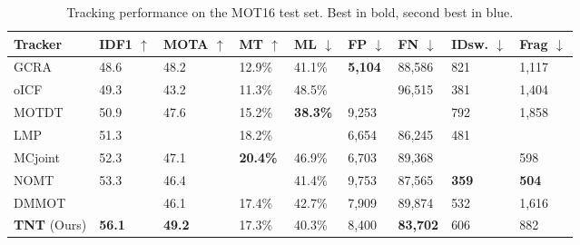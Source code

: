 \documentclass[10pt,twocolumn,letterpaper]{article}
\begin{document}
\begin{table*}
\begin{center}
\begin{tabular}{|L{2.9cm}|C{1.2cm}|C{1.3cm}|C{1.2cm}|C{1.2cm}|C{1.2cm}|C{1.2cm}|C{1.2cm}|C{1.2cm}|}
\hline
Tracker & IDF1 $\uparrow$ & MOTA $\uparrow$ & MT $\uparrow$ & ML $\downarrow$ & FP $\downarrow$ & FN $\downarrow$ & IDsw. $\downarrow$ & Frag $\downarrow$ \\
\hline\hline
GCRA \cite{ma2018trajectory} & 48.6 & 48.2 & 12.9\% & 41.1\% & \textbf{5,104} & 88,586 & 821 & 1,117 \\
oICF \cite{kieritz2016online} & 49.3 & 43.2 & 11.3\% & 48.5\% & \noindent\color{cyan}{6,651} & 96,515 & 381 & 1,404 \\
MOTDT \cite{long2018real} & 50.9 & 47.6 & 15.2\% & \textbf{38.3\%} & 9,253 & \noindent\color{cyan}{85,431} & 792 & 1,858 \\
LMP \cite{tang2017multiple} & 51.3 & \noindent\color{cyan}{48.8} & 18.2\% & \noindent\color{cyan}{40.1\%} & 6,654 & 86,245 & 481 & \noindent\color{cyan}{595} \\
MCjoint \cite{keuper2016multi} & 52.3 & 47.1 & \textbf{20.4\%} & 46.9\% & 6,703 & 89,368 & \noindent\color{cyan}{370} & 598 \\
NOMT \cite{choi2015near} & 53.3 & 46.4 & \noindent\color{cyan}{18.3\%} & 41.4\% & 9,753 & 87,565 & \textbf{359} & \textbf{504} \\
DMMOT \cite{zhu2018online} & \noindent\color{cyan}{54.8} & 46.1 & 17.4\% & 42.7\% & 7,909 & 89,874 & 532 & 1,616 \\
\hline
\textbf{TNT} (Ours) & \textbf{56.1} & \textbf{49.2} & 17.3\% & 40.3\% & 8,400 & \textbf{83,702} & 606 & 882 \\
\hline
\end{tabular}
\end{center}
\caption{Tracking performance on the MOT16 test set. Best in bold, second best in blue. 
}
\label{tab:mot16}
\end{table*}
\end{document}
